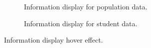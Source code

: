 
\begin{figure}[H]
	\centering
	\newcommand{\figurewidth}{0.4\textwidth}
	\centering
	\begin{subfigure}[b]{\figurewidth}
		\caption{Information display for population data.}
		\label{fig:information_display_population}
	\end{subfigure}
	\begin{subfigure}[b]{\figurewidth}
		\caption{Information display for student data.}
		\label{fig:information_display_student}
	\end{subfigure}
	\caption[Information display]{Information display hover effect.}
	\label{fig:information_display}
\end{figure}

